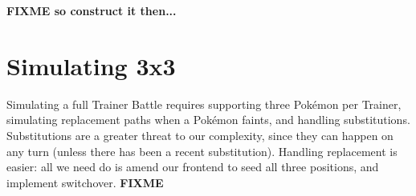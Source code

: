 \textbf{FIXME so construct it then...}

\section{Simulating 3x3}
\label{sec:simul3x3}
Simulating a full Trainer Battle requires supporting three Pokémon per Trainer,
  simulating replacement paths when a Pokémon faints,
  and handling substitutions.
Substitutions are a greater threat to our complexity, since they can happen
  on any turn (unless there has been a recent substitution).
Handling replacement is easier: all we need do is amend our frontend to
  seed all three positions, and implement switchover.
\textbf{FIXME}
